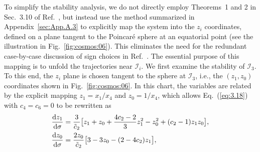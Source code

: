 \documentclass[aps,prd,twocolumn]{revtex4-2}
\newcommand\dx{{\rm d}}
\begin{document}
To simplify the stability analysis, we do not directly employ Theorems~1 and 2 in Sec.~3.10 of Ref.~\cite{Perko2001.book}, but instead use the method summarized in Appendix~\ref{sec:App.A.3} to explicitly map the system into the $z_i$ coordinates, defined on a plane tangent to the Poincar\'e sphere at an equatorial point (see the illustration in Fig.~\ref{fig:cosmos:06}). This eliminates the need for the redundant case-by-case discussion of sign choices in Ref.~\cite{Perko2001.book}. The essential purpose of this mapping is to unfold the trajectories near $\mathcal{I}_i$. We first examine the stability of $\mathcal{I}_3$. To this end, the $z_i$ plane is chosen tangent to the sphere at $\mathcal{I}_3$, i.e., the $(z_1,z_0)$ coordinates shown in Fig.~\ref{fig:cosmos:06}. In this chart, the variables are related by the explicit mapping $z_1=x_1/x_4$ and $z_0=1/x_4$, which allows Eq.~(\ref{eq:3.18}) with $c_4=c_6=0$ to be rewritten as
\begin{subequations}\label{eq:3.19}
\begin{align}
  \frac{\dx z_1}{\dx\sigma} &= \frac{3}{\tilde{c}_2} \big[z_1+z_0 + \frac{4c_2-2}{3}z_1^2 - z_0^2 + (c_2-1)z_1z_0\big], \\
  \frac{\dx z_0}{\dx\sigma} &= \frac{2z_0}{\tilde{c}_2} \big[3 - 3z_0 - (2-4c_2)z_1\big], \label{eq:3.19b}
\end{align}
\end{subequations}
\end{document}
